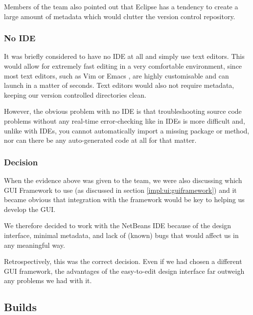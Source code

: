 Members of the team also pointed out that Eclipse has a tendency to
create a large amount of metadata which would clutter the version
control repository.

\subsubsection{No IDE}
\label{impl:ui:ide:noide}

It was briefly considered to have no IDE at all and simply use text
editors.
This would allow for extremely fast editing in a very comfortable
environment, since most text editors, such as Vim \cite{vim} or Emacs
\cite{emacs}, are highly customisable and can launch in a matter of
seconds.
Text editors would also not require metadata, keeping our version
controlled directories clean.

However, the obvious problem with no IDE is that troubleshooting
source code problems without any real-time error-checking like in IDEs
is more difficult and, unlike with IDEs, you cannot automatically
import a missing package or method, nor can there be any
auto-generated code at all for that matter.

\subsubsection{Decision}
\label{impl:ui:ide:decision}

When the evidence above was given to the team, we were also discussing
which GUI Framework to use (as discussed in section
\ref{impl:ui:guiframework}) and it became obvious that integration
with the framework would be key to helping us develop the GUI.

We therefore decided to work with the NetBeans IDE because of the
design interface, minimal metadata, and lack of (known) bugs that
would affect us in any meaningful way.

Retrospectively, this was the correct decision.
Even if we had chosen a different GUI framework, the advantages of the
easy-to-edit design interface far outweigh any problems we had with
it.

\subsection{Builds}
\label{impl:ui:builds}

